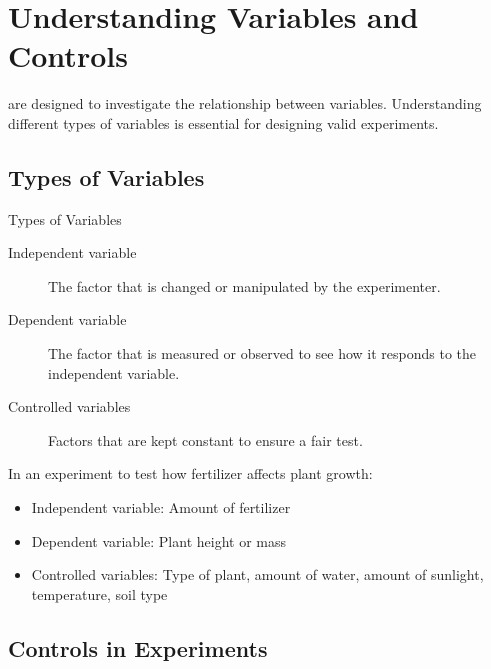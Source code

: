 \section{Understanding Variables and Controls}

 are designed to investigate the relationship between variables. Understanding different types of variables is essential for designing valid experiments.

\subsection{Types of Variables}

\begin{keyconcept}{Types of Variables}
\begin{description}
    \item[Independent variable] The factor that is changed or manipulated by the experimenter.
    \item[Dependent variable] The factor that is measured or observed to see how it responds to the independent variable.
    \item[Controlled variables] Factors that are kept constant to ensure a fair test.
\end{description}
\end{keyconcept}


\begin{example}
In an experiment to test how fertilizer affects plant growth:
\begin{itemize}
    \item Independent variable: Amount of fertilizer
    \item Dependent variable: Plant height or mass
    \item Controlled variables: Type of plant, amount of water, amount of sunlight, temperature, soil type
\end{itemize}
\end{example}

\subsection{Controls in Experiments}

